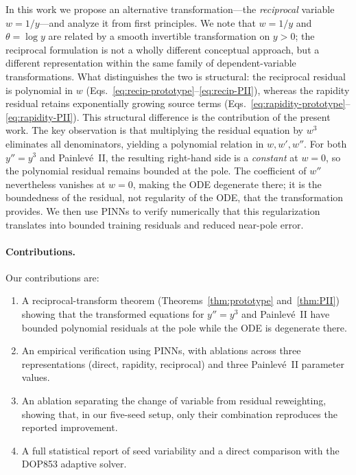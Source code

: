 \documentclass[11pt,a4paper]{article}
\theoremstyle{definition}
\begin{document}
In this work we propose an alternative transformation---the \emph{reciprocal} variable $w = 1/y$---and analyze it from first principles. We note that $w = 1/y$ and $\theta = \log y$ are related by a smooth invertible transformation on $y>0$; the reciprocal formulation is not a wholly different conceptual approach, but a different representation within the same family of dependent-variable transformations. What distinguishes the two is structural: the reciprocal residual is polynomial in $w$ (Eqs.~\ref{eq:recip-prototype}--\ref{eq:recip-PII}), whereas the rapidity residual retains exponentially growing source terms (Eqs.~\ref{eq:rapidity-prototype}--\ref{eq:rapidity-PII}). This structural difference is the contribution of the present work. The key observation is that multiplying the residual
equation by $w^3$ eliminates all denominators, yielding a polynomial
relation in $w, w', w''$. For both $y''=y^3$ and Painlev\'e~II, the resulting right-hand side is a \emph{constant} at $w=0$, so the polynomial residual remains bounded at the pole. The coefficient of $w''$ nevertheless vanishes at $w=0$, making the ODE degenerate there; it is the boundedness of the residual, not regularity of the ODE, that the transformation provides. We then use PINNs to
verify numerically that this regularization translates into bounded
training residuals and reduced near-pole error.

\paragraph{Contributions.}
Our contributions are:
\begin{enumerate}
\item A reciprocal-transform theorem (Theorems~\ref{thm:prototype}
      and~\ref{thm:PII}) showing that the transformed equations for $y''=y^3$ and Painlev\'e~II have bounded polynomial residuals at the pole while the ODE is degenerate there.
\item An empirical verification using PINNs, with ablations across
      three representations (direct, rapidity, reciprocal) and three
      Painlev\'e~II parameter values.
\item An ablation separating the change of variable from residual reweighting, showing that, in our five-seed setup, only their combination reproduces the reported improvement.
\item A full statistical report of seed variability and a
      direct comparison with the DOP853 adaptive solver.
\end{enumerate}
\end{document}
